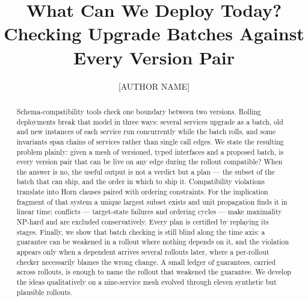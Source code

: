 \usepackage{booktabs}
\usepackage{xcolor}
\usepackage{tcolorbox}

\newcommand{\todoinput}[1]{\begin{tcolorbox}[colback=orange!12,colframe=orange!70!black,title=\textbf{needs your input}]\small #1\end{tcolorbox}}

\newcommand{\Send}{\mathsf{Send}}
\newcommand{\Accept}{\mathsf{Accept}}
\newcommand{\Return}{\mathsf{Return}}
\newcommand{\Expect}{\mathsf{Expect}}
\newcommand{\leqreq}{\leq_{\mathsf{req}}}
\newcommand{\leqres}{\leq_{\mathsf{res}}}
\newcommand{\GUS}{\mathrm{GUS}}



\title{What Can We Deploy Today?\\ Checking Upgrade Batches Against Every Version Pair}

\author{[AUTHOR NAME]}
\affiliation{\institution{[AFFILIATION]}\city{}\country{}}
\email{[EMAIL]}

\begin{abstract}
Schema-compatibility tools check one boundary between two versions.
Rolling deployments break that model in three ways: several services
upgrade as a batch, old and new instances of each service run
concurrently while the batch rolls, and some invariants span chains of
services rather than single call edges. We state the resulting problem
plainly: given a mesh of versioned, typed interfaces and a proposed
batch, is every version pair that can be live on any edge during the
rollout compatible? When the answer is no, the useful output is not a
verdict but a plan --- the subset of the batch that can ship, and the
order in which to ship it. Compatibility violations translate into
Horn clauses paired with ordering constraints. For the implication
fragment of that system a unique largest subset exists and unit
propagation finds it in linear time; conflicts --- target-state
failures and ordering cycles --- make maximality NP-hard and are
excluded conservatively. Every plan is
certified by replaying its stages. Finally, we show that batch
checking is still blind along the time axis: a guarantee can be
weakened in a rollout where nothing depends on it, and the violation
appears only when a dependent arrives several rollouts later, where a
per-rollout checker necessarily blames the wrong change. A small
ledger of guarantees, carried across rollouts, is enough to name the
rollout that weakened the guarantee. We develop the ideas
qualitatively on a nine-service mesh evolved through eleven synthetic
but plausible rollouts.
\end{abstract}

